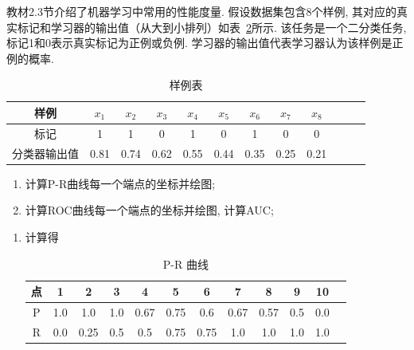 \documentclass[answers]{exam}  %
\begin{document}
\begin{questions}
  教材2.3节介绍了机器学习中常用的性能度量. 假设数据集包含8个样例, 其对应的真实标记和学习器的输出值（从大到小排列）如表~\ref{table:roc}所示. 该任务是一个二分类任务, 标记1和0表示真实标记为正例或负例.
  学习器的输出值代表学习器认为该样例是正例的概率.
  \begin{table}[!h]
    \centering
    \caption{样例表} \vspace{2mm}\label{table:roc}
    \begin{tabular}{c|c c c c c c c c c c c}\toprule
      样例         & $x_1$ & $x_2$ & $x_3$ & $x_4$ & $x_5$ & $x_{6}$ & $x_{7}$ & $x_{8}$ \\
      \midrule
      标记         & 1     & 1     & 0     & 1     & 0     & 1       & 0       & 0       \\
      \midrule
      分类器输出值 & 0.81  & 0.74  & 0.62  & 0.55  & 0.44  & 0.35    & 0.25    & 0.21    \\
      \bottomrule
    \end{tabular}
  \end{table}
  \begin{enumerate}
    \item 计算P-R曲线每一个端点的坐标并绘图;
    \item 计算ROC曲线每一个端点的坐标并绘图, 计算AUC;
  \end{enumerate}
  \begin{solution}
    \begin{enumerate}
      \item 计算得

            \begin{table}[H]
              \centering
              \caption{P-R 曲线} \vspace{2mm}\label{table:roc}
              \begin{tabular}{c|c c c c c c c c c c c}\toprule
                点         & 1 & 2 & 3 & 4 & 5 & 6 & 7 & 8 & 9 & 10 \\
                \midrule
                P        &  1.0 &  1.0 &  1.0 &  0.67 &  0.75 &  0.6 &  0.67 &  0.57 &  0.5 &  0.0       \\
                \midrule
                R  &  0.0 &  0.25 &  0.5 &  0.5 &  0.75 &  0.75 &  1.0 &  1.0 &  1.0 &  1.0    \\
                \bottomrule
              \end{tabular}
            \end{table}


\end{enumerate}
\end{solution}
\end{questions}
\end{document}
